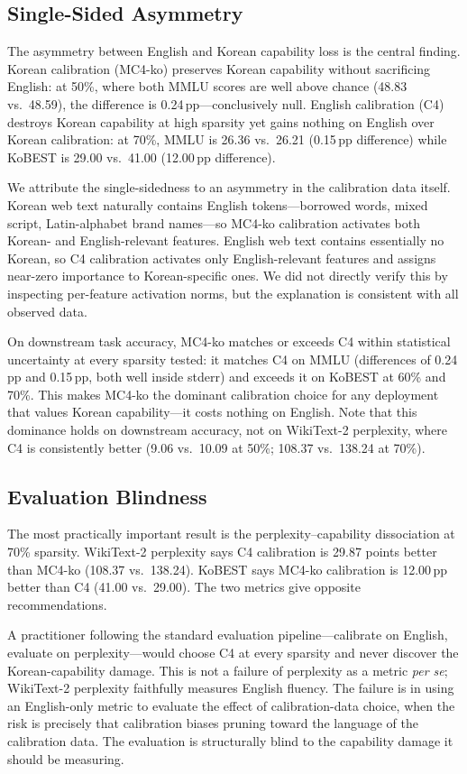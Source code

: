\documentclass{article}
\begin{document}
\subsection{Single-Sided Asymmetry}

The asymmetry between English and Korean capability loss is the central finding.
Korean calibration (MC4-ko) preserves Korean capability without sacrificing English: at 50\%, where both MMLU scores are well above chance (48.83 vs.\ 48.59), the difference is 0.24\,pp---conclusively null.
English calibration (C4) destroys Korean capability at high sparsity yet gains nothing on English over Korean calibration: at 70\%, MMLU is 26.36 vs.\ 26.21 (0.15\,pp difference) while KoBEST is 29.00 vs.\ 41.00 (12.00\,pp difference).

We attribute the single-sidedness to an asymmetry in the calibration data itself.
Korean web text naturally contains English tokens---borrowed words, mixed script, Latin-alphabet brand names---so MC4-ko calibration activates both Korean- and English-relevant features.
English web text contains essentially no Korean, so C4 calibration activates only English-relevant features and assigns near-zero importance to Korean-specific ones.
We did not directly verify this by inspecting per-feature activation norms, but the explanation is consistent with all observed data.

On downstream task accuracy, MC4-ko matches or exceeds C4 within statistical uncertainty at every sparsity tested: it matches C4 on MMLU (differences of 0.24\,pp and 0.15\,pp, both well inside stderr) and exceeds it on KoBEST at 60\% and 70\%.
This makes MC4-ko the dominant calibration choice for any deployment that values Korean capability---it costs nothing on English.
Note that this dominance holds on downstream accuracy, not on WikiText-2 perplexity, where C4 is consistently better (9.06 vs.\ 10.09 at 50\%; 108.37 vs.\ 138.24 at 70\%).

\subsection{Evaluation Blindness}

The most practically important result is the perplexity--capability dissociation at 70\% sparsity.
WikiText-2 perplexity says C4 calibration is 29.87 points better than MC4-ko (108.37 vs.\ 138.24).
KoBEST says MC4-ko calibration is 12.00\,pp better than C4 (41.00 vs.\ 29.00).
The two metrics give opposite recommendations.

A practitioner following the standard evaluation pipeline---calibrate on English, evaluate on perplexity---would choose C4 at every sparsity and never discover the Korean-capability damage.
This is not a failure of perplexity as a metric \emph{per se}; WikiText-2 perplexity faithfully measures English fluency.
The failure is in using an English-only metric to evaluate the effect of calibration-data choice, when the risk is precisely that calibration biases pruning toward the language of the calibration data.
The evaluation is structurally blind to the capability damage it should be measuring.
\end{document}
